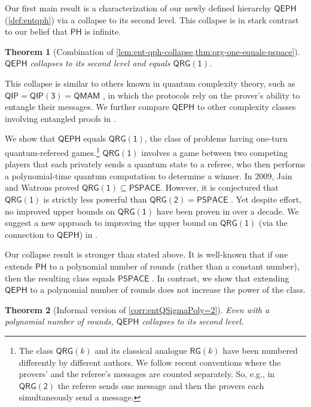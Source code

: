 \documentclass[10pt,a4paper]{article}
\newtheorem{theorem}{Theorem}[section]
\theoremstyle{definition}
\newcommand{\class}[1]{\ensuremath{\mathsf{#1}}\xspace}
\newcommand{\PSPACE}{\class{PSPACE}}
\newcommand{\QIP}{\class{QIP}}
\newcommand{\QIPk}[1][k]{\class{QIP(#1)}}
\newcommand{\QRG}{\class{QRG}}
\newcommand{\QRGk}[1][k]{\class{QRG(#1)}}
\newcommand{\QRGone}{\QRGk[1]}
\newcommand{\QRGtwo}{\QRGk[2]}
\newcommand{\RG}{\class{RG}}
\newcommand{\QMAM}{\class{QMAM}}
\newcommand{\PH}{\class{PH}}
\newcommand{\QEPH}{\class{QEPH}}
\begin{document}
Our first main result is a characterization of our newly defined hierarchy $\QEPH$ (\cref{def:entqph}) via a collapse to its second level. This collapse is in stark contrast to our belief that $\PH$ is infinite.

\begin{theorem}[Combination of \cref{lem:ent-qph-collapse,thm:qrg-one-equals-pspace}] 
$\QEPH$ collapses to its second level and equals $\QRGone$.
\end{theorem}


This collapse is similar to others known in quantum complexity theory, such as $\QIP = \QIPk[3] = \QMAM$ \cite{kitaev2000parallelization,marriott2005quantum}, 
in which the protocols rely on the prover's ability to entangle their messages.
We further compare $\QEPH$ to other complexity classes involving entangled proofs in .

We show that $\QEPH$ equals $\QRGone$, the class of problems having one-turn quantum-refereed games.\footnote{The class $\QRG(k)$ and its classical analogue $\RG(k)$ have been numbered differently by different authors. We follow recent conventions
where the provers' and the referee's messages are counted separately.
So, e.g., in $\QRGtwo$ the referee sends one message and then the provers each simultaneously send a message.}
$\QRGone$ involves a game between two competing players that each privately sends a quantum state to a referee, who then performs a polynomial-time quantum computation to determine a winner.
In 2009, Jain and Watrous \cite{jain2009parallel} proved $\QRGone \subseteq \PSPACE$. 
However, it is conjectured that $\QRGone$ is strictly less powerful than $\QRGtwo=\PSPACE$ \cite{gutoski2013parallel,ghosh2023complexity}. 
Yet despite effort, no improved upper bounds on $\QRGone$ have been proven in over a decade. 
We suggest a new approach to improving the upper bound on $\QRGone$ (via the connection to $\QEPH$) in .




Our collapse result is stronger than stated above.
It is well-known that if one extends $\PH$ to a polynomial number of rounds (rather than a constant number), then the resulting class equals $\PSPACE$ \cite[Theorem 4.11]{arora2009computational}.
In contrast, we show that extending $\QEPH$ to a polynomial number of rounds does not increase the power of the class. 

\begin{theorem}[Informal version of \cref{corr:entQSigmaPoly=2}]
   Even with a polynomial number of rounds, $\QEPH$ collapses to its second level.
\end{theorem}
\end{document}
